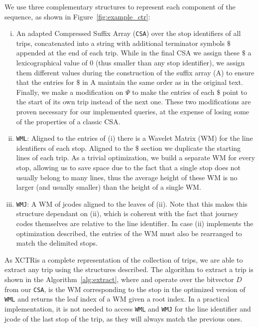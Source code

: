 \documentclass[runningheads]{llncs}
\newcommand{\ctr}{XCTR}
\begin{document}
We use three complementary structures to represent each component of the sequence, as shown in Figure~\ref{fig:example_ctr}:
\begin{enumerate}[(i)]
    \item An adapted Compressed Suffix Array (\texttt{CSA}) over the stop identifiers of all trips, concatenated into a string with additional terminator symbols $\$$ appended at the end of each trip. While in the final CSA we assign these $\$$ a lexicographical value of 0 (thus smaller than any stop identifier), we assign them different values during the construction of the suffix array (A) to ensure that the entries for $\$$ in A maintain the same order as in the original text. Finally, we make a modification on $\Psi$ to make the entries of each $\$$ point to the start of its own trip instead of the next one. These two modifications are proven necessary for our implemented queries, at the expense of losing some of the properties of a classic CSA.
    \item \texttt{WML}: Aligned to the entries of (i) there is a Wavelet Matrix (WM) for the line identifiers of each stop. Aligned to the $\$$ section we duplicate the starting lines of each trip. As a trivial optimization, we build a separate WM for every stop, allowing us to save space due to the fact that a single stop does not usually belong to many lines, thus the average height of these WM is no larger (and usually smaller) than the height of a single WM.
    \item \texttt{WMJ}: A WM of jcodes aligned to the leaves of (ii). Note that this makes this structure dependant on (ii), which is coherent with the fact that journey codes themselves are relative to the line identifier. In case (ii) implements the optimization described, the entries of the WM must also be rearranged to match the delimited stops.
\end{enumerate}

As \ctr is a complete representation of the collection of trips, we are able to extract any trip using the structures described.  The algorithm to extract a trip is shown in the Algorithm~\ref{alg:extract}, where  and  operate over the bitvector $D$ from our \texttt{CSA},  is the WM corresponding to the stop  in the optimized version of \texttt{WML} and  returns the leaf index of a WM given a root index. In a practical implementation, it is not needed to access \texttt{WML} and \texttt{WMJ} for the line identifier and jcode of the last stop of the trip, as they will always match the previous ones.
\end{document}
